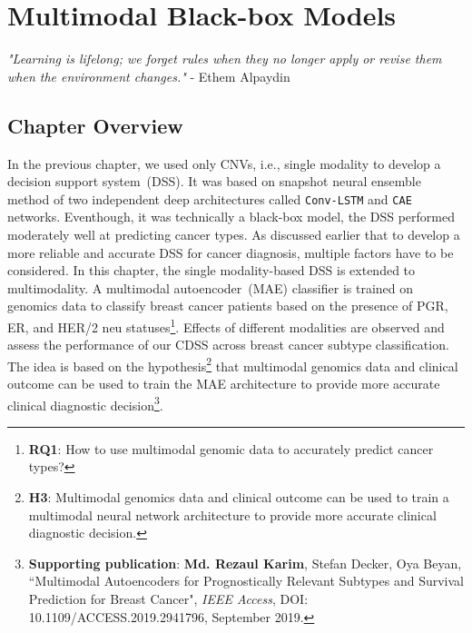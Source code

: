 \chapter{Multimodal Black-box Models}
\label{chapter:multiodality}

\textit{"Learning is lifelong; we forget rules when they no longer apply or revise them when the environment changes."} - Ethem Alpaydin 

\section{Chapter Overview}
In the previous chapter, we used only CNVs, i.e., single modality to develop a decision support system~(DSS). It was based on snapshot neural ensemble method of two independent deep architectures called \texttt{Conv-LSTM} and \texttt{CAE} networks. Eventhough, it was technically a black-box model, the DSS performed moderately well at predicting cancer types. As discussed earlier that to develop a more reliable and accurate DSS for cancer diagnosis, multiple factors have to be considered. In this chapter, the single modality-based DSS is extended to multimodality. A multimodal autoencoder~(MAE) classifier is trained on genomics data to classify breast cancer patients based on the presence of PGR, ER, and HER/2 neu statuses\footnote{\textbf{RQ1}: How to use multimodal genomic data to accurately predict cancer
types?}. Effects of different modalities are observed and assess the performance of our CDSS across breast cancer subtype classification. The idea is based on the hypothesis\footnote{\textbf{H3}: Multimodal genomics data and clinical outcome can be used to train a multimodal neural network architecture to provide more accurate clinical diagnostic decision.} that multimodal genomics data and clinical outcome can be used to train the MAE architecture to provide more accurate clinical diagnostic decision\footnote{\textbf{Supporting publication}: \textbf{Md. Rezaul Karim}, Stefan Decker, Oya Beyan, ``Multimodal Autoencoders for Prognostically Relevant Subtypes and Survival Prediction for Breast Cancer", \emph{IEEE Access}, DOI: 10.1109/ACCESS.2019.2941796, September 2019.}. 

